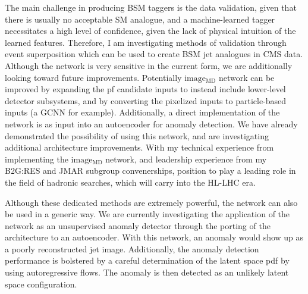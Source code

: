 \documentclass[12pt]{article}
\begin{document}
The main challenge in producing BSM taggers is the data validation, given that there
is usually no acceptable SM analogue, and a machine-learned tagger necessitates a
high level of confidence, given the lack of physical intuition of the learned features.
Therefore, I am investigating methods of validation through event superposition
which can be used to create BSM jet analogues in CMS data.  Although the network is
very sensitive in the current form, we are additionally looking toward future improvements.
Potentially $\mathrm{image_{MD}}$ network can be improved by expanding the pf candidate inputs to
instead include lower-level detector subsystems, and by converting the pixelized inputs
to particle-based inputs (a GCNN for example).  Additionally, a direct implementation
of the network is as input into an autoencoder for anomaly detection.  We have already
demonstrated the possibility of using this network, and are investigating additional
architecture improvements.  With my technical experience from implementing the
$\mathrm{image_{MD}}$ network, and leadership experience from my
B2G:RES and JMAR subgroup convenerships, position to play a leading role in the
field of hadronic searches, which will carry into the HL-LHC era.

Although these dedicated methods are
extremely powerful, the network can also be used in a generic way.
We are currently investigating the application of the network as an unsupervised
anomaly detector through the porting of the architecture to an autoencoder.
With this network, an anomaly would show up as a poorly reconstructed jet image.
Additionally, the anomaly detection performance is bolstered by a careful determination of the latent space pdf by using autoregressive flows.
The anomaly is then detected as an unlikely latent space configuration.
\end{document}
